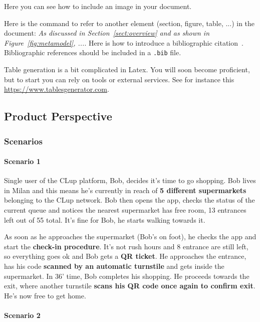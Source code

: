 \sffamily
Here you can see how to include an image in your document.

Here is the command to refer to another element (section, figure, table, ...) in the document: \emph{As discussed in Section~\ref{sect:overview} and as shown in Figure~\ref{fig:metamodel}, ...}. Here is how to introduce a bibliographic citation~\cite{DAM}. Bibliographic references should be included in a \texttt{.bib} file. 

Table generation is a bit complicated in Latex. You will soon become proficient, but to start you can rely on tools or external services. See for instance this \href{https://www.tablesgenerator.com}{https://www.tablesgenerator.com}. \\

\subsection{\sffamily Product Perspective}
\subsubsection{\sffamily Scenarios}
\paragraph{Scenario 1}

Single user of the CLup platform, Bob, decides it's time to go shopping.
Bob lives in Milan and this means he's currently in reach of \textbf{5 different supermarkets} belonging to the CLup network. \newline
Bob then opens the app, checks the status of the current queue and notices the nearest supermarket has free room, 13 entrances left out of 55 total. It's fine for Bob, he starts walking towards it.

As soon as he approaches the supermarket (Bob's on foot), he checks the app and start the \textbf{check-in procedure}. It's not rush hours and 8 entrance are still left, so everything goes ok and Bob gets a \textbf{QR ticket}. He approaches the entrance, has his code \textbf{scanned by an automatic turnstile} and gets inside the supermarket.\newline
In 36' time, Bob completes his shopping. He proceeds towards the exit, where another turnstile \textbf{scans his QR code once again to confirm exit}. He's now free to get home.

\paragraph{Scenario 2}

